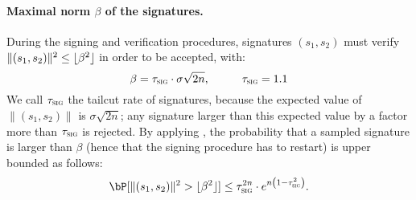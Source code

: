 \paragraph{Maximal norm $\beta$ of the signatures.} During the signing and verification procedures, signatures $(s_1, s_2)$ must verify $\|(s_1, s_2)\|^2 \leq \lfloor \beta^2 \rfloor$ in order to be accepted, with:
\begin{equation}\label{eq:beta}
\beta = \sigrate \cdot \sigma \sqrt{2n}, \hspace*{10mm} \sigrate = \sigrateval
\end{equation}
We call $\tau_{\text{\textsc{sig}}}$ the tailcut rate of signatures, because the expected value of $\|(s_1, s_2)\|$ is $\sigma \sqrt{2n}$; any signature larger than this expected value by a factor more than $\tau_{\text{\textsc{sig}}}$ is rejected. By applying \cite[Lemma 4.4, Item 3]{EC:Lyubashevsky12}, the probability that a sampled signature is larger than $\beta$ (hence that the signing procedure has to restart) is upper bounded as follows:
\begin{equation}\label{eq:rejrate}
\bP[\|(s_1, s_2)\|^2 > \sqsignorm] \leq \sigrate^{2n} \cdot e^{n \left(1 - \sigrate^{2} \right)}.
\end{equation}
